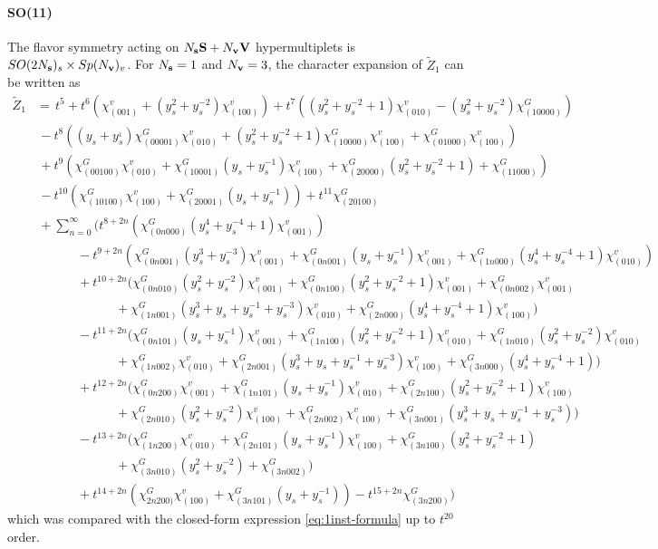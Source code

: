 \documentclass[letterpaper, 11pt]{article}
\newcommand{\nn}{\nonumber}
\begin{document}
{\paragraph{SO(11)} The flavor symmetry acting on $N_{\bf s} \mathbf{S} + N_{\bf v} \mathbf{V}$ hypermultiplets is $SO(2N_{\bf s})_s \times  Sp(N_{\bf v})_v$. For $N_{\bf s}=1$ and  $N_{\bf v} = 3$, the character expansion of  $\tilde{Z}_1$ can be written as
\begin{align}
  \label{eq:so11-s1v3}
\tilde{Z}_1&=\,t^5+t^6(\chi^v_{(001)}+(y_s^2+y_s^{-2})\chi^v_{(100)})+t^7((y_s^2+y_s^{-2}+1)\chi^v_{(010)}-(y_s^{2}+y_s^{-2})\chi^G_{(10000)})\nn\\
&\,-t^8((y_s+y_s^{_1})\chi^G_{(00001)}\chi^v_{(010)}+(y_s^2+y_s^{-2}+1)\chi^G_{(10000)}\chi^v_{(100)}+\chi^G_{(01000)}\chi^v_{(100)})\nn\\
&\,+t^9(\chi^G_{(00100)}\chi^v_{(010)}+\chi^G_{(10001)}(y_s+y_s^{-1})\chi^v_{(100)}+\chi^G_{(20000)}(y_s^2+y_s^{-2}+1)+\chi^G_{(11000)})\nn\\
&\,-t^{10}(\chi^G_{(10100)}\chi^v_{(100)}+\chi^G_{(20001)}(y_s+y_s^{-1}))+t^{11}\chi^G_{(20100)}\\
&\,+\sum_{n=0}^{\infty}\Big(t^{8+2n}(\chi^G_{(0n000)}(y_s^4+y_s^{-4}+1)\chi^v_{(001)})\nn\\
&\quad\qquad\ -t^{9+2n}(\chi^G_{(0n001)}(y_s^3+y_s^{-3})\chi^v_{(001)}+\chi^G_{(0n001)}(y_s+y_s^{-1})\chi^v_{(001)}+\chi^G_{(1n000)}(y_s^4+y_s^{-4}+1)\chi^v_{(010)})\nn\\
&\qquad\quad\ +t^{10+2n}(\chi^G_{(0n010)}(y_s^2+y_s^{-2})\chi^v_{(001)}+\chi^G_{(0n100)}(y_s^2+y_s^{-2}+1)\chi^v_{(001)}+\chi^G_{(0n002)}\chi^v_{(001)}\nn\\
&\qquad\qquad\qquad\ +\chi^G_{(1n001)}(y_s^3+y_s+y_s^{-1}+y_s^{-3})\chi^v_{(010)}+\chi^G_{(2n000)}(y_s^4+y_s^{-4}+1)\chi^v_{(100)})\nn\\
&\qquad\quad\ -t^{11+2n}(\chi^G_{(0n101)}(y_s+y_s^{-1})\chi^v_{(001)}+\chi^G_{(1n100)}(y_s^2+y_s^{-2}+1)\chi^v_{(010)}+\chi^G_{(1n010)}(y_s^2+y_s^{-2})\chi^v_{(010)}\nn\\
&\qquad\qquad\qquad\ +\chi^G_{(1n002)}\chi^v_{(010)}+\chi^G_{(2n001)}(y_s^3+y_s+y_s^{-1}+y_s^{-3})\chi^v_{(100)}+\chi^G_{(3n000)}(y_s^4+y_s^{-4}+1))\nn\\
&\qquad\quad\ +t^{12+2n}(\chi^G_{(0n200)}\chi^v_{(001)}+\chi^G_{(1n101)}(y_s+y_s^{-1})\chi^v_{(010)}+\chi^G_{(2n100)}(y_s^2+y_s^{-2}+1)\chi^v_{(100)}\nn\\
&\qquad\qquad\qquad\ +\chi^G_{(2n010)}(y_s^2+y_s^{-2})\chi^v_{(100)}+\chi^G_{(2n002)}\chi^v_{(100)}+\chi^G_{(3n001)}(y_s^3+y_s+y_s^{-1}+y_s^{-3}))\nn\\
&\qquad\quad\ -t^{13+2n}(\chi^G_{(1n200)}\chi^v_{(010)}+\chi^G_{(2n101)}(y_s+y_s^{-1})\chi^v_{(100)}+\chi^G_{(3n100)}(y_s^2+y_s^{-2}+1)\nn\\
&\qquad\qquad\qquad\ +\chi^G_{(3n010)}(y_s^2+y_s^{-2})+\chi^G_{(3n002)})\nn\\
&\qquad\quad\ +t^{14+2n}(\chi^G_{2n200)}\chi^v_{(100)}+\chi^G_{(3n101)}(y_s+y_s^{-1}))-t^{15+2n}\chi^G_{(3n200)}\Big) \nn
\end{align}
which was compared with the closed-form expression \eqref{eq:1inst-formula} up to $t^{20}$ order.

}
\end{document}
